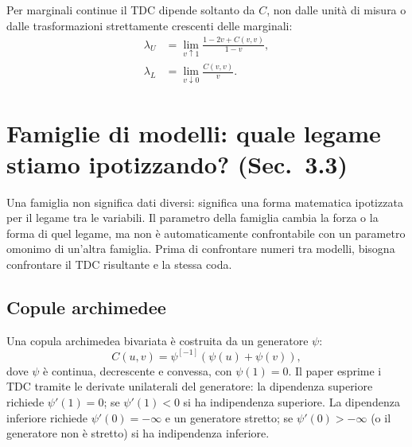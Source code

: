 \documentclass[11pt,a4paper]{article}
\begin{document}
Per marginali continue il TDC dipende soltanto da $C$, non dalle unità di
misura o dalle trasformazioni strettamente crescenti delle marginali:
\begin{align}
  \lambda_U&=\lim_{v\uparrow1}\frac{1-2v+C(v,v)}{1-v},
  \label{eq:copula-upper}\\
  \lambda_L&=\lim_{v\downarrow0}\frac{C(v,v)}{v}.
  \label{eq:copula-lower}
\end{align}

\section{Famiglie di modelli: quale legame stiamo ipotizzando? (Sec.~3.3)}

Una famiglia non significa dati diversi: significa una forma matematica
ipotizzata per il legame tra le variabili. Il parametro della famiglia cambia
la forza o la forma di quel legame, ma non è automaticamente confrontabile
con un parametro omonimo di un'altra famiglia. Prima di confrontare numeri tra
modelli, bisogna confrontare il TDC risultante e la stessa coda.

\subsection{Copule archimedee}
Una copula archimedea bivariata è costruita da un generatore $\psi$:
\begin{equation}
  C(u,v)=\psi^{[-1]}\!\left(\psi(u)+\psi(v)\right),
  \label{eq:arch}
\end{equation}
dove $\psi$ è continua, decrescente e convessa, con $\psi(1)=0$.
Il paper esprime i TDC tramite le derivate unilaterali del generatore: la
dipendenza superiore richiede $\psi'(1)=0$; se $\psi'(1)<0$ si ha
indipendenza superiore. La dipendenza inferiore richiede $\psi'(0)=-\infty$
e un generatore stretto; se $\psi'(0)>-\infty$ (o il generatore non è
stretto) si ha indipendenza inferiore.
\end{document}
